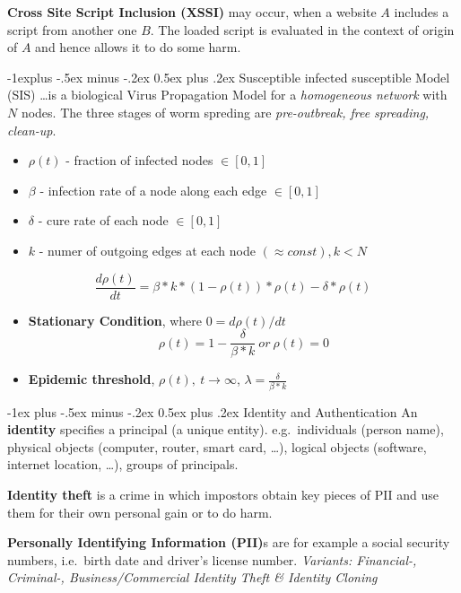 \documentclass[a4paper,twocolumn]{article}
\makeatletter
\newenvironment{itemization}[1][\small]{%
    \begin{itemize}[leftmargin=*]
            #1
        }{%
    \end{itemize}
}
\renewcommand{\section}{%
    \@startsection{section}{1}{0mm}%
    {-1ex plus -.5ex minus -.2ex}%
    {0.5ex plus .2ex}%
    {\normalfont\normalsize\bfseries\sectionrule{12pt}{0.4pt}{0pt}{0pt}}
}
\renewcommand{\subsection}{%
    \@startsection{subsection}{2}{0mm}%
    {-1explus -.5ex minus -.2ex}%
    {0.5ex plus .2ex}%
    {\normalfont\small\bfseries}
}
\makeatother
\begin{document}
\begin{footnotesize}
\textbf{Cross Site Script Inclusion (XSSI)} may occur, when a website $A$ includes a script from another one $B$. The loaded script is evaluated in the context of origin of $A$ and hence allows it to do some harm.

\subsection{Susceptible infected susceptible Model (SIS)}
\ldots is a biological Virus Propagation Model for a \textit{homogeneous network} with $N$ nodes. The three stages of worm spreding are \textit{pre-outbreak, free spreading, clean-up}.
\begin{itemization}
\item \textbf{$\rho(t)$} - fraction of infected nodes $\in [0,1]$ 
\item \textbf{$\beta$} - infection rate of a node along each edge $\in [0,1]$
\item \textbf{$\delta$} - cure rate of each node $\in [0,1]$
\item \textbf{$k$} - numer of outgoing edges at each node $(\approx const), k < N$
\end{itemization}
\[\frac{d\rho(t)}{dt} = \beta*k*(1-\rho(t))*\rho(t) - \delta*\rho(t) \]
\begin{itemization} 
\item \textbf{Stationary Condition}, where $0=d\rho(t)/dt$
\[\rho(t)=1 - \frac{\delta}{\beta*k}\ or\ \rho(t)=0 \]
\item \textbf{Epidemic threshold}, $\rho(t),\ t\rightarrow\infty$, $\lambda = \frac{\delta}{\beta*k}$ 
\end{itemization}

\section{Identity and Authentication}
An \textbf{identity} specifies a principal (a unique entity). e.g.\ individuals (person name), physical objects (computer, router, smart card, \ldots), logical objects (software, internet location, \ldots), groups of principals.

\textbf{Identity theft} is a crime in which impostors obtain key pieces of PII and use them for their own personal gain or to do harm.

\textbf{Personally Identifying Information (PII)}s are for example a social security numbers, i.e.\ birth date and driver's license number. \textit{Variants: Financial-, Criminal-, Business/Commercial Identity Theft \& Identity Cloning}


\end{footnotesize}
\end{document}
